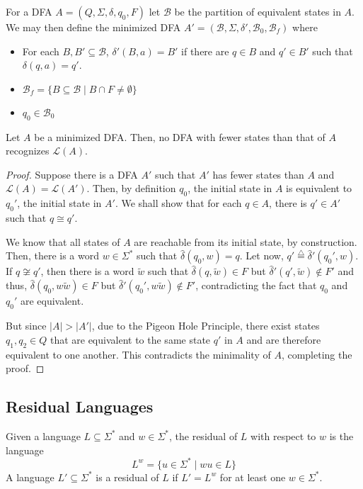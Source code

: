 For a DFA $A = (Q,\Sigma,\delta,q_0,F)$ let $\mathcal{B}$ be the partition of equivalent states in $A$. We may then define the minimized DFA $A' = (\mathcal{B}, \Sigma,\delta',\mathcal{B}_0, \mathcal{B}_f)$ where 
\begin{itemize}
    \item For each $B,B'\subseteq\mathcal{B}$, $\delta'(B, a) = B'$ if there are $q\in B$ and $q'\in B'$ such that $\delta(q, a) = q'$.
    \item $\mathcal{B}_f = \{B\subseteq\mathcal{B}\mid B\cap F\ne\emptyset\}$ 
    \item $q_0\in\mathcal{B}_0$
\end{itemize}

\begin{proposition}
    Let $A$ be a minimized DFA. Then, no DFA with fewer states than that of $A$ recognizes $\mathcal{L}(A)$.
\end{proposition}
\begin{proof}
    Suppose there is a DFA $A'$ such that $A'$ has fewer states than $A$ and $\mathcal{L}(A) = \mathcal{L}(A')$. Then, by definition $q_0$, the initial state in $A$ is equivalent to $q_0'$, the initial state in $A'$. We shall show that for each $q\in A$, there is $q'\in A'$ such that $q\cong q'$. 

    We know that all states of $A$ are reachable from its initial state, by construction. Then, there is a word $w\in\Sigma^*$ such that $\hat{\delta}(q_0, w) = q$. Let now, $q'\overset{\triangle}{=}\hat{\delta}'(q_0', w)$. If $q\not\cong q'$, then there is a word $\tilde{w}$ such that $\hat{\delta}(q, \tilde{w})\in F$ but $\hat{\delta}'(q',\tilde{w})\notin F'$ and thus, $\hat{\delta}(q_0, w\tilde{w})\in F$ but $\hat{\delta}'(q_0',w\tilde{w})\notin F'$, contradicting the fact that $q_0$ and $q_0'$ are equivalent.

    But since $|A|>|A'|$, due to the Pigeon Hole Principle, there exist states $q_1,q_2\in Q$ that are equivalent to the same state $q'$ in $A$ and are therefore equivalent to one another. This contradicts the minimality of $A$, completing the proof.
\end{proof}

\subsection{Residual Languages}
\begin{definition}
    Given a language $L\subseteq\Sigma^*$ and $w\in\Sigma^*$, the residual of $L$ with respect to $w$ is the language 
    \begin{equation*}
        L^w = \{u\in\Sigma^*\mid wu\in L\}
    \end{equation*}
    A language $L'\subseteq\Sigma^*$ is a residual of $L$ if $L' = L^w$ for at least one $w\in\Sigma^*$.
\end{definition}

